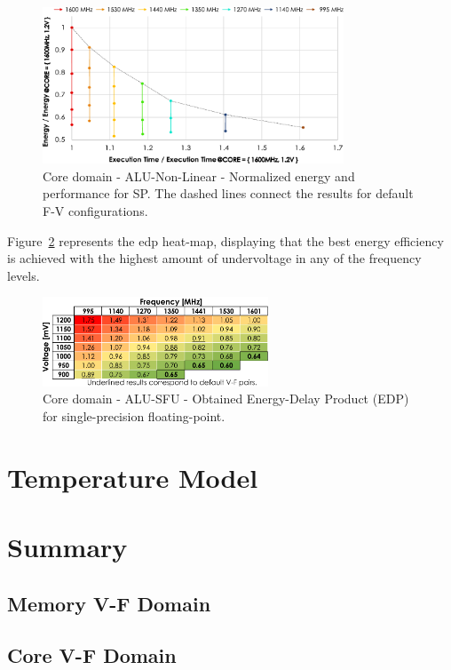 \begin{figure}[htb]
  \centering
  \includegraphics[width=0.8\textwidth]{Figures/GPU_characterization/SFU_behaviour.pdf}
  \caption{Core domain - ALU-Non-Linear - Normalized energy and performance for SP. The dashed lines connect the results for default F-V configurations.}
  \label{fig:SFU_behaviour}
\end{figure}

Figure~\ref{fig:SFU_EDP} represents the \acrshort{edp} heat-map, displaying that the best energy efficiency is achieved with the highest amount of undervoltage in any of the frequency levels.

\begin{figure}[htb]
    \centering
        \includegraphics[width=0.6\textwidth]{Figures/GPU_characterization/SFU_EDP_SP.pdf}
        \caption{Core domain - ALU-SFU - Obtained Energy-Delay Product (EDP) for single-precision floating-point.}
    \label{fig:SFU_EDP}
\end{figure}

\section{Temperature Model}
\label{sec:temp_model}

\newpage
\section{Summary}


\subsection{Memory V-F Domain}
\label{section:memory}



\subsection{Core V-F Domain}
\label{section:core}